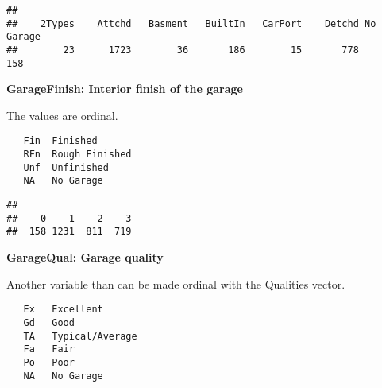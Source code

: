 \documentclass[]{article}
\newenvironment{Shaded}{\begin{snugshade}}{\end{snugshade}}
\newcommand{\KeywordTok}[1]{\textcolor[rgb]{0.13,0.29,0.53}{\textbf{#1}}}
\newcommand{\DecValTok}[1]{\textcolor[rgb]{0.00,0.00,0.81}{#1}}
\newcommand{\StringTok}[1]{\textcolor[rgb]{0.31,0.60,0.02}{#1}}
\newcommand{\OperatorTok}[1]{\textcolor[rgb]{0.81,0.36,0.00}{\textbf{#1}}}
\newcommand{\NormalTok}[1]{#1}
\begin{document}
\begin{verbatim}
## 
##    2Types    Attchd   Basment   BuiltIn   CarPort    Detchd No Garage 
##        23      1723        36       186        15       778       158
\end{verbatim}

\textbf{GarageFinish: Interior finish of the garage}

The values are ordinal.

\begin{verbatim}
   Fin  Finished
   RFn  Rough Finished  
   Unf  Unfinished
   NA   No Garage       
\end{verbatim}

\begin{Shaded}
\end{Shaded}

\begin{verbatim}
## 
##    0    1    2    3 
##  158 1231  811  719
\end{verbatim}

\textbf{GarageQual: Garage quality}

Another variable than can be made ordinal with the Qualities vector.

\begin{verbatim}
   Ex   Excellent
   Gd   Good
   TA   Typical/Average
   Fa   Fair
   Po   Poor
   NA   No Garage
   
\end{verbatim}

\begin{Shaded}
\end{Shaded}
\end{document}
